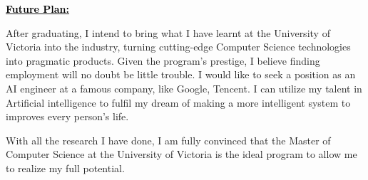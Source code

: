 \documentclass[12pt]{article}
\newcommand{\statement}[1]{\par\medskip
  \underline{\textcolor{black}{\textbf{#1:}}}\space
}
\begin{document}
\bigskip

\statement{Future Plan}
After graduating, I intend to bring what I have learnt at the University of Victoria into the industry, turning cutting-edge Computer Science technologies into pragmatic products. Given the program's prestige, I believe finding employment will no doubt be little trouble. I would like to seek a position as an AI engineer at a famous company, like Google, Tencent. I can utilize my talent in Artificial intelligence to fulfil my dream of making a more intelligent system to improves every person's life.

\bigskip

With all the research I have done, I am fully convinced that the Master of Computer Science at the University of Victoria is the ideal program to allow me to realize my full potential.
\end{document}
